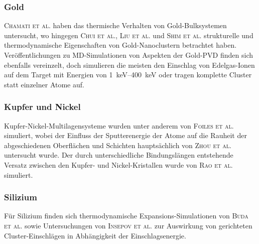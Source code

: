 \subsubsection{Gold}
\textsc{Chamati et al.}\cite{chamati_second-moment_2004} haben das thermische Verhalten von Gold-Bulksystemen untersucht, wo hingegen \textsc{Chui et al.}\cite{chui_molecular_2007}, \textsc{Liu et al.}\cite{liu_melting_2001} und \textsc{Shim et al.}\cite{shim_molecular_2003} strukturelle und thermodynamische Eigenschaften von Gold-Nanoclustern betrachtet haben.
Veröffentlichungen zu MD-Simulationen von Aspekten der Gold-PVD finden sich ebenfalls vereinzelt, doch simulieren die meisten den Einschlag von Edelgas-Ionen auf dem Target mit Energien von \SIrange{1}{400}{\kilo\electronvolt}\cite{insepov_molecular_1995,shapiro_simulation_1999} oder tragen komplette Cluster statt einzelner Atome auf\cite{inoue_molecular_2008}.

\subsubsection{Kupfer und Nickel}
Kupfer-Nickel-Multilagensysteme wurden unter anderem von \textsc{Foiles et al.}\cite{foiles_calculation_1985} simuliert, wobei der Einfluss der Sputterenergie der Atome auf die Rauheit der abgeschiedenen Oberflächen und Schichten hauptsächlich von \textsc{Zhou et al.}\cite{zhou_atomistic_1998} untersucht wurde.
Der durch unterschiedliche Bindungslängen entstehende Versatz zwischen den Kupfer- und Nickel-Kristallen wurde von \textsc{Rao et al.}\cite{rao_atomistic_2000} simuliert.

\subsubsection{Silizium}
Für Silizium finden sich thermodynamische Expansions-Simulationen von \textsc{Buda et al.}\cite{buda_thermal_1990} sowie Untersuchungen von \textsc{Insepov et al.}\cite{insepov_molecular_1995} zur Auswirkung von gerichteten Cluster-Einschlägen in Abhängigkeit der Einschlagsenergie.

